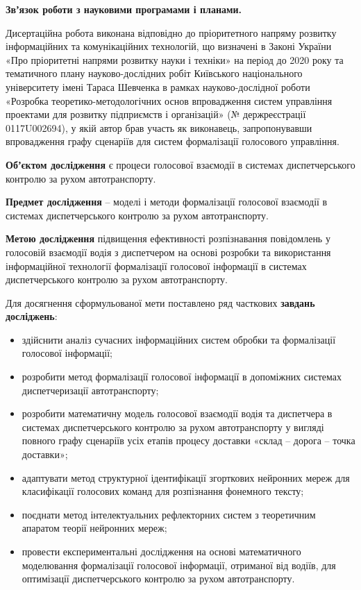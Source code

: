 \textbf{Звʼязок роботи з науковими програмами і планами.}

Дисертаційна робота виконана відповідно до пріоритетного напряму розвитку інформаційних та комунікаційних технологій, що визначені в Законі України «Про пріоритетні напрями розвитку науки і техніки» на період до 2020 року та тематичного плану науково-дослідних робіт Київського національного університету імені Тараса Шевченка в рамках науково-дослідної роботи «Розробка теоретико-методологічних основ впровадження систем управління проектами для розвитку підприємств і організацій» (№ держреєстрації 0117U002694), у якій автор брав участь як виконавець, запропонувавши впровадження графу сценаріїв для систем формалізації голосового управління.

\textbf{Обʼєктом дослідження} є процеси голосової взаємодії в системах диспетчерського контролю за рухом автотранспорту.

\textbf{Предмет дослідження} – моделі і методи формалізації голосової взаємодії в системах диспетчерського контролю за рухом автотранспорту.

\textbf{Метою дослідження} підвищення ефективності розпізнавання повідомлень у голосовій взаємодії водія з диспетчером на основі розробки та використання інформаційної технології формалізації голосової інформації в системах диспетчерського контролю за рухом автотранспорту.

Для досягнення сформульованої мети поставлено ряд часткових \textbf{завдань досліджень}:

\begin{itemize}
	\item здійснити аналіз сучасних інформаційних систем обробки та формалізації голосової інформації;
	\item розробити метод формалізації голосової інформації в допоміжних системах диспетчеризації автотранспорту;
	\item розробити математичну модель голосової взаємодії водія та диспетчера в системах диспетчерського контролю за рухом автотранспорту у вигляді повного графу сценаріїв усіх етапів процесу доставки «склад – дорога – точка доставки»;
	\item адаптувати метод структурної ідентифікації згорткових нейронних мереж для класифікації голосових команд для розпізнання фонемного тексту;
	\item поєднати метод інтелектуальних рефлекторних систем з теоретичним апаратом теорії нейронних мереж;
	\item провести експериментальні дослідження на основі математичного моделювання формалізації голосової інформації, отриманої від водіїв, для оптимізації диспетчерського контролю за рухом автотранспорту.
\end{itemize}

